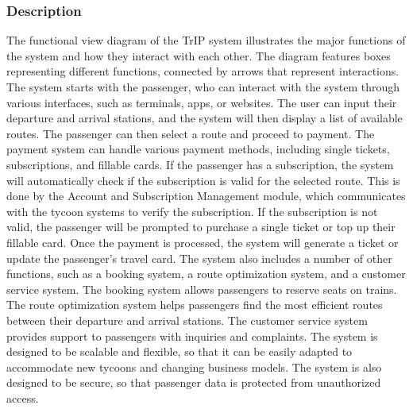 \subsubsection{Description}
The functional view diagram of the TrIP system illustrates the major functions of the system and how they interact with each other. The diagram features boxes representing different functions, connected by arrows that represent interactions.
The system starts with the passenger, who can interact with the system through various interfaces, such as terminals, apps, or websites. The user can input their departure and arrival stations, and the system will then display a list of available routes. The passenger can then select a route and proceed to payment.
The payment system can handle various payment methods, including single tickets, subscriptions, and fillable cards. If the passenger has a subscription, the system will automatically check if the subscription is valid for the selected route. This is done by the Account and Subscription Management module, which communicates with the tycoon systems to verify the subscription. If the subscription is not valid, the passenger will be prompted to purchase a single ticket or top up their fillable card.
Once the payment is processed, the system will generate a ticket or update the passenger's travel card.
The system also includes a number of other functions, such as a booking system, a route optimization system, and a customer service system. The booking system allows passengers to reserve seats on trains. The route optimization system helps passengers find the most efficient routes between their departure and arrival stations. The customer service system provides support to passengers with inquiries and complaints.
The system is designed to be scalable and flexible, so that it can be easily adapted to accommodate new tycoons and changing business models. The system is also designed to be secure, so that passenger data is protected from unauthorized access.

